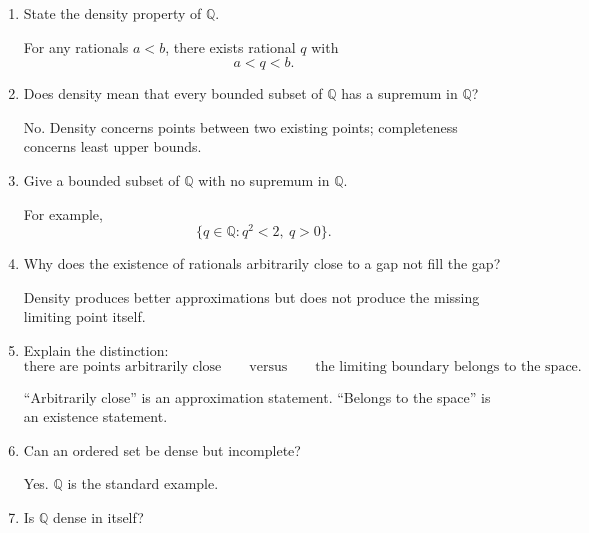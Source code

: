 \documentclass{self-check}
\begin{document}
\begin{enumerate}[label=\arabic*., itemsep=10pt]

\item State the density property of $\mathbb{Q}$.

\begin{answer}
For any rationals $a<b$, there exists rational $q$ with
\[
a<q<b.
\]
\end{answer}

\item Does density mean that every bounded subset of $\mathbb{Q}$ has a supremum in $\mathbb{Q}$?

\begin{answer}
No. Density concerns points between two existing points; completeness concerns least upper bounds.
\end{answer}

\item Give a bounded subset of $\mathbb{Q}$ with no supremum in $\mathbb{Q}$.

\begin{answer}
For example,
\[
\{q\in\mathbb{Q}:q^2<2,\ q>0\}.
\]
\end{answer}

\item Why does the existence of rationals arbitrarily close to a gap not fill the gap?

\begin{answer}
Density produces better approximations but does not produce the missing limiting point itself.
\end{answer}

\item Explain the distinction:
\[
\text{there are points arbitrarily close}
\qquad\text{versus}\qquad
\text{the limiting boundary belongs to the space}.
\]

\begin{answer}
``Arbitrarily close'' is an approximation statement. ``Belongs to the space'' is an existence statement.
\end{answer}

\item Can an ordered set be dense but incomplete?

\begin{answer}
Yes. $\mathbb{Q}$ is the standard example.
\end{answer}

\item Is $\mathbb{Q}$ dense in itself?


\end{enumerate}
\end{document}
